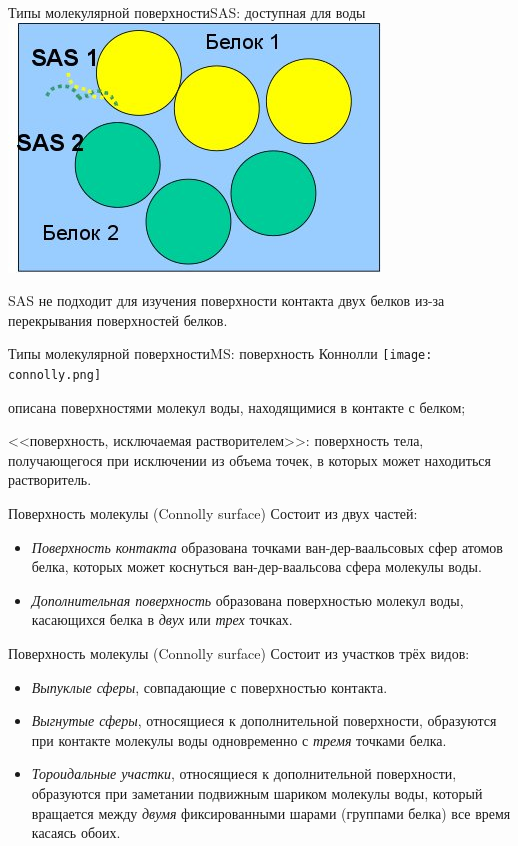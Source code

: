 \documentclass{beamer}
\begin{document}
    \begin{frame}{Типы молекулярной поверхности}{SAS: доступная для воды}
        \includegraphics[width=0.5\linewidth]{sas-contact.jpg}

        SAS не подходит для изучения поверхности контакта двух белков
        из-за перекрывания поверхностей белков.
    \end{frame}

    \begin{frame}{Типы молекулярной поверхности}{MS: поверхность Коннолли}
        \texttt{[image: connolly.png]}

        описана поверхностями молекул воды, находящимися в контакте с белком;

        <<поверхность, исключаемая растворителем>>:
        поверхность тела, получающегося при исключении из объема точек,
        в которых может находиться растворитель.

    \end{frame}

    \begin{frame}{Поверхность молекулы (Connolly surface)}
        Состоит из двух частей:
        \begin{itemize}
        \item \emph{Поверхность контакта} образована точками ван-дер-ваальсовых
            сфер атомов белка, которых может коснуться ван-дер-ваальсова сфера
            молекулы воды.
        \item \emph{Дополнительная поверхность} образована поверхностью
            молекул воды, касающихся белка в \emph{двух} или \emph{трех} точках.
        \end{itemize}
    \end{frame}

    \begin{frame}{Поверхность молекулы (Connolly surface)}
        Состоит из участков трёх видов:
        \begin{itemize}
        \item \emph{Выпуклые сферы}, совпадающие с поверхностью контакта.
        \item \emph{Выгнутые сферы}, относящиеся к дополнительной поверхности,
            образуются при контакте молекулы воды одновременно с \emph{тремя}
            точками белка.
        \item \emph{Тороидальные участки},
            относящиеся к дополнительной поверхности,
            образуются при заметании подвижным шариком молекулы воды,
            который вращается между \emph{двумя} фиксированными шарами
            (группами белка) все время касаясь обоих.
        \end{itemize}
    \end{frame}
\end{document}
